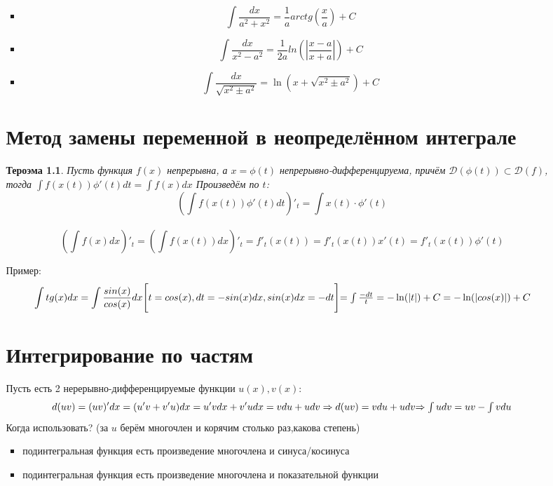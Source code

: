 \documentclass[oneside]{book}
\newtheorem{thm}{Тероэма}[chapter] %
\begin{document}
\begin{enumerate}
\begin{itemize}
\begin{enumerate}
\begin{itemize}
\begin{equation}
  \end{equation}
  \item \begin{equation}
    \int \frac{dx}{a^2 + x^2} = \frac{1}{a}arctg(\frac{x}{a}) + C
  \end{equation}
  \item \begin{equation}
    \int \frac{dx}{x^2 - a^2} = \frac{1}{2a}ln(|\frac{x - a}{x + a}|) + C
  \end{equation}
  \item \begin{equation}
    \int \frac{dx}{\sqrt{x^2 \pm a^2}} = \ln(x + \sqrt{x^2 \pm a^2}) + C
  \end{equation}
\end{itemize}
\setcounter{chapter}{32}
\chapter[Замен переменной]{Метод замены переменной в неопределённом интеграле}
\begin{thm}
  Пусть функция $f(x)$ непрерывна, а $x = \phi(t)$ непрерывно-дифференцируема, причём $\mathcal{D}(\phi(t)) \subset \mathcal{D}(f)$, тогда
  $\int f(x(t)) \phi'(t) dt = \int f(x) dx$ Произведём по $t$: $$
  (\int f(x(t)) \phi'(t) dt)'_t = \int x(t) \cdot \phi'(t) $$\\$$
  (\int f(x) dx)'_t = (\int f(x(t))dx)'_t = f'_t(x(t)) = f'_t(x(t))x'(t) = f'_t(x(t))\phi'(t)
  $$
\end{thm}
Пример:
\begin{equation}
  \int tg(x)dx = \int \frac{sin(x)}{cos(x)}dx \\
  \Bigg[t = cos(x), dt = -sin(x)dx, sin(x)dx = -dt \Bigg] $$\\$$ =
  \int \frac{-dt}{t} = -\ln(|t|)+C = -\ln(|cos(x)|) + C
\end{equation}
\setcounter{chapter}{33}
\chapter{Интегрирование по частям}
Пусть есть 2 нерерывно-дифференцируемые функции $u(x), v(x)$: \begin{equation}
  d(uv) = (uv)'dx = (u'v + v'u)dx = u'vdx + v'udx = vdu + udv \Rightarrow d(uv) = vdu + udv
  $\\$ \Rightarrow \int udv = uv - \int vdu
\end{equation}
Когда использовать?
(за $u$ берём многочлен и корячим столько раз,какова степень)
\begin{itemize}
  \item подинтегральная функция есть произведение многочлена и синуса/косинуса
  \item подинтегральная функция есть произведение многочлена и показательной функции
\end{itemize}



\end{enumerate}
\end{itemize}
\end{enumerate}
\end{document}

